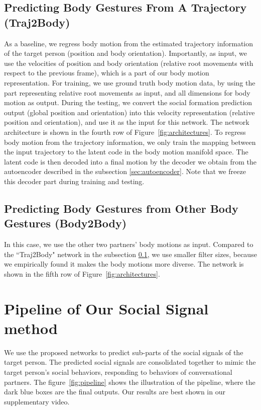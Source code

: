 \subsection{Predicting Body Gestures From A Trajectory (Traj2Body)}
\label{sec:traj2body}
As a baseline, we regress body motion from the estimated trajectory information of the target person (position and body orientation). Importantly, as input, we use the velocities of position and body orientation (relative root movements with respect to the previous frame), which is a part of our body motion representation. For training, we use ground truth body motion data, by using the part representing relative root movements as input, and all dimensions for body motion as output. During the testing, we convert the social formation prediction output (global position and orientation) into this velocity representation (relative position and orientation), and use it as the input for this network. The network architecture is shown in the fourth row of Figure~\ref{fig:architectures}. To regress body motion from the trajectory information, we only train the mapping between the input trajectory to the latent code in the body motion manifold space. The latent code is then decoded into a final motion by the decoder we obtain from the autoencoder described in the subsection \ref{sec:autoencoder}. Note that we freeze this decoder part during training and testing. 

\subsection{Predicting Body Gestures from Other Body Gestures (Body2Body)}

In this case, we use the other two partners' body motions as input. Compared to the ``Traj2Body" network in the subsection \ref{sec:traj2body}, we use smaller filter sizes, because we empirically found it makes the body motions more diverse. The network is shown in the fifth row of Figure~\ref{fig:architectures}.

\section{Pipeline of Our Social Signal method}
We use the proposed networks to predict sub-parts of the social signals of the target person. The predicted social signals are consolidated together to mimic the target person's social behaviors, responding to behaviors of conversational partners. The figure~\ref{fig:pipeline} shows the illustration of the pipeline, where the dark blue boxes are the final outputs. Our results are best shown in our supplementary video. 
